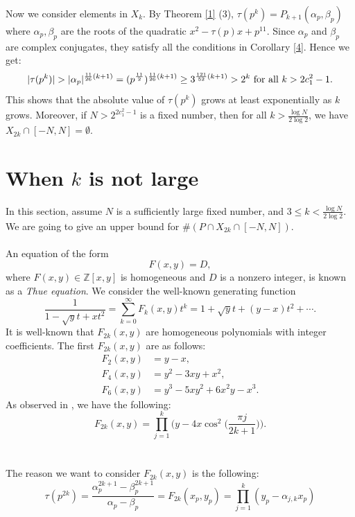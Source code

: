 \documentclass[12pt]{amsart}
\numberwithin{equation}{section}
\begin{document}
Now we consider elements in $X_k$. By Theorem \ref{1} (3), $\tau(p^k)=P_{k+1}(\alpha_p,\beta_p)$ where $\alpha_p,\beta_p$ are the roots of the quadratic $x^2-\tau(p)x+p^{11}$. Since $\alpha_p$ and $\beta_p$ are complex conjugates, they satisfy all the conditions in Corollary \ref{4}. Hence we get:
\begin{equation}\label{Q}
    |\tau(p^k)|>|\alpha_p|^{\frac{11}{26}(k+1)}=(p^{\frac{11}{2}})^{\frac{11}{26}(k+1)}\geq 3^{\frac{121}{52}(k+1)}>2^k
    \textup{  for all }k>2c_1^2-1.
\end{equation}
This shows that the absolute value of $\tau(p^k)$ grows at least exponentially as $k$ grows. Moreover, if $N>2^{2c_1^2-1}$ is a fixed number, then for all $k>\frac{\log N}{2\log2}$, we have $X_{2k}\cap[-N,N]=\emptyset$.

\section{When $k$ is not large}
In this section, assume $N$ is a sufficiently large fixed number, and  $3\leq k<\frac{\log N}{2\log 2}$. We are going to give an upper bound for $\# ( P\cap X_{2k}\cap [-N,N] )$. \\\\
An equation of the form
\[
F(x,y) = D,
\]
where $F(x,y) \in \mathbb{Z}[x,y]$ is homogeneous and $D$ is a nonzero integer,
is known as a \emph{Thue equation}. We consider the well-known generating function \cite[(4.1)]{BCOT} \begin{equation}
    \frac{1}{1-\sqrt{y}t+xt^2}=\sum_{k=0}^\infty F_k(x,y)t^k=1+\sqrt{y}t+(y-x)t^2+\cdots.
\end{equation}
It is well-known that $F_{2k}(x,y)$ are homogeneous polynomials with integer coefficients. The first $F_{2k}(x,y)$ are as follows:
\begin{align*}
F_{2}(x,y)  &= y - x, \\
F_{4}(x,y)  &= y^{2} - 3xy + x^{2}, \\
F_{6}(x,y)  &= y^{3} - 5xy^{2} + 6x^{2}y - x^{3}.
\end{align*}
As observed in \cite{BCOT}, we have the following:
\begin{equation}\label{thue}
    F_{2k}(x,y)=\prod_{j=1}^k\bigg(y-4x\cos^2{\bigg(\frac{\pi j}{2k+1}\bigg)}\bigg).
\end{equation}
\\\\
The reason we want to consider $F_{2k}(x,y)$ is the following:
\begin{equation}
    \tau(p^{2k})=\frac{\alpha_p^{2k+1}-\beta_p^{2k+1}}{\alpha_p-\beta_p}=F_{2k}(x_p,y_p)=\prod_{j=1}^k(y_p-\alpha_{j,k}x_p)
\end{equation}
\end{document}
